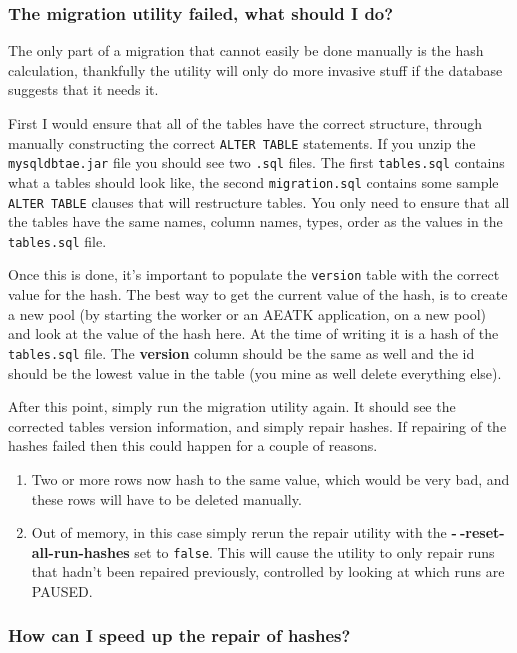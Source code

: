 \documentclass[11pt,letterpaper,oneside]{article}
\begin{document}
\subsubsection{The migration utility failed, what should I do?}

The only part of a migration that cannot easily be done manually is the hash calculation, thankfully the utility will only do more invasive stuff if the database suggests that it needs it.

First I would ensure that all of the tables have the correct structure, through manually constructing the correct \texttt{ALTER TABLE} statements. If you unzip the \texttt{mysqldbtae.jar} file you should see two \texttt{.sql} files. The first \texttt{tables.sql} contains what a tables should look like, the second \texttt{migration.sql} contains some sample \texttt{ALTER TABLE} clauses that will restructure tables. You only need to ensure that all the tables have the same names, column names, types, order as the values in the \texttt{tables.sql} file.  

Once this is done, it's important to populate the \texttt{version} table with the correct value for the hash. The best way to get the current value of the hash, is to create a new pool (by starting the worker or an AEATK application, on a new pool) and look at the value of the hash here. At the time of writing it is a hash of the \texttt{tables.sql} file. The \textbf{version} column should be the same as well and the id should be the lowest value in the table (you mine as well delete everything else). 

After this point, simply run the migration utility again. It should see the corrected tables version information, and simply repair hashes. If repairing of the hashes failed then this could happen for a couple of reasons.

\begin{enumerate}
\item Two or more rows now hash to the same value, which would be very bad, and these rows will have to be deleted manually. 
\item Out of memory, in this case simply rerun the repair utility with the \textbf{-$~\!$-reset-all-run-hashes} set to \texttt{false}. This will cause the utility to only repair runs that hadn't been repaired previously, controlled by looking at which runs are PAUSED.
\end{enumerate}


\subsubsection{How can I speed up the repair of hashes?}
\end{document}
